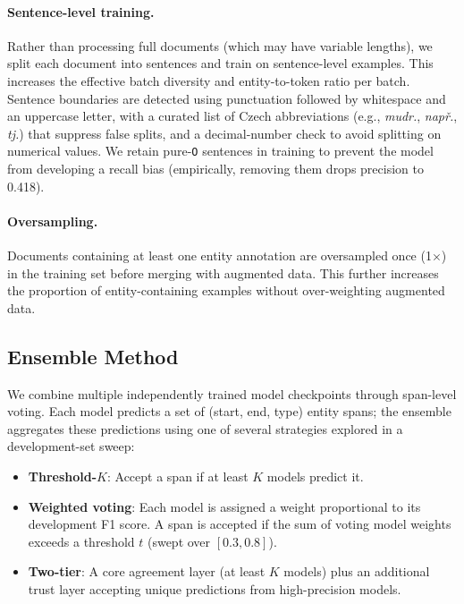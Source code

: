\documentclass[11pt]{article}
\begin{document}
\paragraph{Sentence-level training.}
Rather than processing full documents (which may have variable lengths), we split each
document into sentences and train on sentence-level examples. This increases the
effective batch diversity and entity-to-token ratio per batch. Sentence boundaries are
detected using punctuation followed by whitespace and an uppercase letter, with a
curated list of Czech abbreviations (e.g., \textit{mudr.}, \textit{např.}, \textit{tj.})
that suppress false splits, and a decimal-number check to avoid splitting on numerical
values. We retain pure-\texttt{O} sentences in training to prevent the model from
developing a recall bias (empirically, removing them drops precision to 0.418).

\paragraph{Oversampling.}
Documents containing at least one entity annotation are oversampled once (1$\times$) in
the training set before merging with augmented data. This further increases the proportion
of entity-containing examples without over-weighting augmented data.

\subsection{Ensemble Method}

We combine multiple independently trained model checkpoints through span-level voting.
Each model predicts a set of (start, end, type) entity spans; the ensemble aggregates
these predictions using one of several strategies explored in a development-set sweep:

\begin{itemize}
  \item \textbf{Threshold-$K$}: Accept a span if at least $K$ models predict it.
  \item \textbf{Weighted voting}: Each model is assigned a weight proportional to its
        development F1 score. A span is accepted if the sum of voting model weights
        exceeds a threshold $t$ (swept over $[0.3, 0.8]$).
  \item \textbf{Two-tier}: A core agreement layer (at least $K$ models) plus an
        additional trust layer accepting unique predictions from high-precision models.
\end{itemize}
\end{document}
